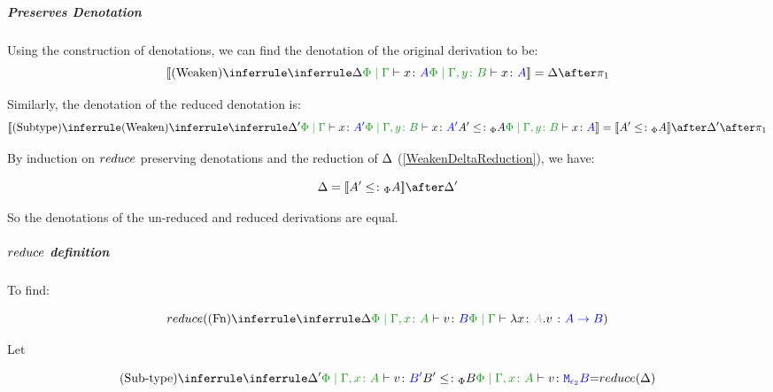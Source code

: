 {            \subparagraph{Preserves Denotation}
            Using the construction of denotations, we can find the denotation of the original derivation to be:
            \begin{equation}
                \deno{\ntreeruleI{Weaken}{\treeruleI{\D}{\gpetyperelation{x}{A}}}{\etyperelation{\P}{\gby}{x}{A}}} = \D \after \p
            \end{equation}

            Similarly, the denotation of the reduced denotation is:
            \begin{equation}
                \deno{\ntreeruleII{Subtype}{
                    \ntreeruleI{Weaken}{
                        \treeruleI{\D'}{\gpetyperelation{x}{A'}}
                    } {
                        \etyperelation{\P}{\gby}{x}{A'}
                    }
                    }{
                    A' \subtypep A
                    }{\etyperelation{\P}{\gby}{x}{A}}} = \deno{A'\subtypep A}\after \D' \after \p
            \end{equation}


            By induction on $reduce$ preserving denotations and the reduction of $\Delta$ (\ref{WeakenDeltaReduction}), we have:

            \begin{equation}
                \D = \deno{A' \subtypep A}\after\D'
            \end{equation}

            So the denotations of the un-reduced and reduced derivations are equal.

            \subparagraph{$reduce$ definition}
                To find:
            
                \begin{equation}
                    \reduce(\ntreeruleI{Fn}{
                        \treeruleI{\D}{\etyperelation{\P}{\gax}{v}{B}}
                    }{\gpetyperelation{\lam{x}{A}{v}}{\ab}})
                \end{equation}

                Let 

                \begin{equation}
                    \ntreeruleII{Sub-type}{
                        \treeruleI{\D'}{\etyperelation{\P}{\gax}{v}{B'}}
                        B' \subtypep B
                    }{
                        \etyperelation{\P}{\gax}{v}{\M{\e_2}{B}}
                    } = \reduce(\D)
                \end{equation}

}
